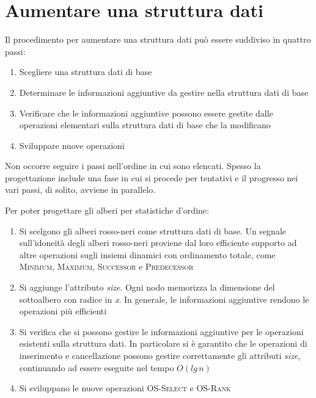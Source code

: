 \documentclass[10pt, a4paper]{report}
\begin{document}
\section{Aumentare una struttura dati}
Il procedimento per aumentare una struttura dati può essere suddiviso in quattro passi:
\begin{enumerate}
\item Scegliere una struttura dati di base
\item Determinare le informazioni aggiuntive da gestire nella struttura dati di base
\item Verificare che le informazioni aggiuntive possono essere gestite dalle operazioni elementari sulla struttura dati di base che la modificano
\item Sviluppare nuove operazioni
\end{enumerate}
Non occorre seguire i passi nell'ordine in cui sono elencati. Spesso la progettazione include una fase in cui si procede per tentativi e il progresso nei vari passi, di solito, avviene in parallelo.

Per poter progettare gli alberi per statistiche d'ordine:
\begin{enumerate}
\item Si scelgono gli alberi rosso-neri come struttura dati di base. Un segnale sull'idoneità degli alberi rosso-neri proviene dal loro efficiente supporto ad altre operazioni sugli insiemi dinamici con ordinamento totale, come \textsc{Minimum}, \textsc{Maximum}, \textsc{Successor} e \textsc{Predecessor}
\item Si aggiunge l'attributo \textit{size}. Ogni nodo memorizza la dimensione del sottoalbero con radice in \textit{x}. In generale, le informazioni aggiuntive rendono le operazioni più efficienti
\item Si verifica che si possono gestire le informazioni aggiuntive per le operazioni esistenti sulla struttura dati. In particolare si è garantito che le operazioni di inserimento e cancellazione possono gestire correttamente gli attributi \textit{size}, continuando ad essere eseguite nel tempo $O(lg\,n)$
\item Si sviluppano le nuove operazioni \textsc{OS-Select} e \textsc{OS-Rank}
\end{enumerate}
\end{document}
